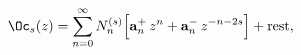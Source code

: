 \begin{equation}
\Oc_s(z)=\sum_{n=0}^{\infty}N_n^{(s)}\Bigl[
\mathbf{a}_n^{+}\,z^n+
\mathbf{a}_n^{-}\, z^{-n-2s}
\Bigr]+\text{rest},
\label{32}
\end{equation}

